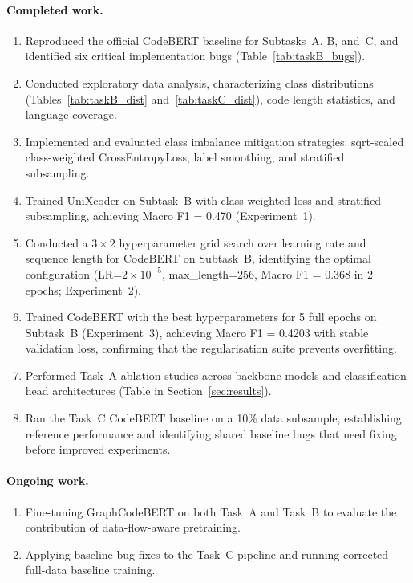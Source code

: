 \documentclass[11pt]{article}
\begin{document}
\paragraph{Completed work.}
\begin{enumerate}
    \item Reproduced the official CodeBERT baseline for Subtasks~A, B, and~C, and identified six critical implementation bugs (Table~\ref{tab:taskB_bugs}).
    \item Conducted exploratory data analysis, characterizing class distributions (Tables~\ref{tab:taskB_dist} and~\ref{tab:taskC_dist}), code length statistics, and language coverage.
    \item Implemented and evaluated class imbalance mitigation strategies: sqrt-scaled class-weighted CrossEntropyLoss, label smoothing, and stratified subsampling.
    \item Trained UniXcoder on Subtask~B with class-weighted loss and stratified subsampling, achieving Macro F1 = 0.470 (Experiment~1).
    \item Conducted a $3 \times 2$ hyperparameter grid search over learning rate and sequence length for CodeBERT on Subtask~B, identifying the optimal configuration (LR=$2{\times}10^{-5}$, max\_length=256, Macro F1 = 0.368 in 2 epochs; Experiment~2).
    \item Trained CodeBERT with the best hyperparameters for 5 full epochs on Subtask~B (Experiment~3), achieving Macro F1 = 0.4203 with stable validation loss, confirming that the regularisation suite prevents overfitting.
    \item Performed Task~A ablation studies across backbone models and classification head architectures (Table in Section~\ref{sec:results}).
    \item Ran the Task~C CodeBERT baseline on a 10\% data subsample, establishing reference performance and identifying shared baseline bugs that need fixing before improved experiments.
\end{enumerate}

\paragraph{Ongoing work.}
\begin{enumerate}
    \item Fine-tuning GraphCodeBERT on both Task~A and Task~B to evaluate the contribution of data-flow-aware pretraining.
    \item Applying baseline bug fixes to the Task~C pipeline and running corrected full-data baseline training.
\end{enumerate}
\end{document}
